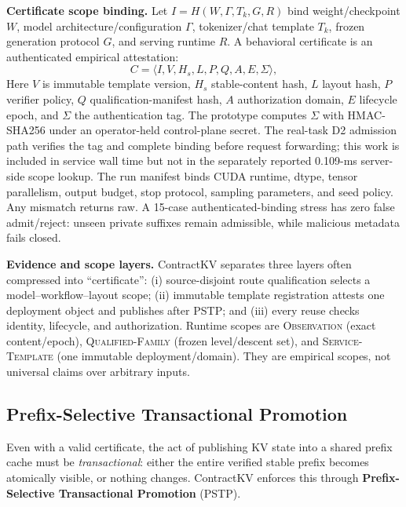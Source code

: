 \documentclass[journal]{IEEEtran}
\begin{document}
\smallskip
\noindent\textbf{Certificate scope binding.}
Let $I=H(W,\Gamma,T_k,G,R)$ bind weight/checkpoint $W$, model architecture/configuration $\Gamma$, tokenizer/chat template $T_k$, frozen generation protocol $G$, and serving runtime $R$. A behavioral certificate is an authenticated empirical attestation:
\begin{equation}
  C=\langle I,V,H_s,L,P,Q,A,E,\Sigma\rangle,
\end{equation}
Here $V$ is immutable template version, $H_s$ stable-content hash, $L$ layout hash, $P$ verifier policy, $Q$ qualification-manifest hash, $A$ authorization domain, $E$ lifecycle epoch, and $\Sigma$ the authentication tag. The prototype computes $\Sigma$ with HMAC-SHA256 under an operator-held control-plane secret. The real-task D2 admission path verifies the tag and complete binding before request forwarding; this work is included in service wall time but not in the separately reported 0.109-ms server-side scope lookup. The run manifest binds CUDA runtime, dtype, tensor parallelism, output budget, stop protocol, sampling parameters, and seed policy. Any mismatch returns raw. A 15-case authenticated-binding stress has zero false admit/reject: unseen private suffixes remain admissible, while malicious metadata fails closed.

\smallskip
\noindent\textbf{Evidence and scope layers.}
ContractKV separates three layers often compressed into ``certificate'': (i) source-disjoint route qualification selects a model--workflow--layout scope; (ii) immutable template registration attests one deployment object and publishes after PSTP; and (iii) every reuse checks identity, lifecycle, and authorization. Runtime scopes are \textsc{Observation} (exact content/epoch), \textsc{Qualified-Family} (frozen level/descent set), and \textsc{Service-Template} (one immutable deployment/domain). They are empirical scopes, not universal claims over arbitrary inputs.

\subsection{Prefix-Selective Transactional Promotion}
\label{sec:pstp}

Even with a valid certificate, the act of publishing KV state into a shared prefix cache must be \emph{transactional}: either the entire verified stable prefix becomes atomically visible, or nothing changes. ContractKV enforces this through \textbf{Prefix-Selective Transactional Promotion} (PSTP).
\end{document}

